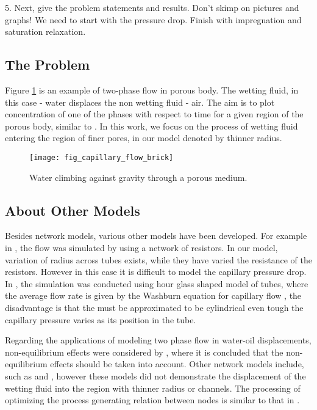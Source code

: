{5. Next, give the problem statements and results. Don't skimp on pictures and graphs!
We need to start with the pressure drop.
Finish with impregnation and saturation relaxation.




\subsection{The Problem}
	Figure \ref{fig_capillary_flow_brick} is an example of two-phase flow in porous body. The wetting fluid, in this case - water displaces the non wetting fluid - air. The aim is to plot concentration of one of the phases with respect to time for a given region of the porous body, similar to \cite{fatt1956network}. In this work, we focus on the process of wetting fluid entering the region of finer pores, in our model denoted by thinner radius.
	
	\begin{figure}[H]
		\texttt{[image: fig\_capillary\_flow\_brick]}
		\caption{Water climbing against gravity through a porous medium. \cite{wiki:Capillary_action}}
		\label{fig_capillary_flow_brick}
	\end{figure}
	
\subsection{About Other Models}
	Besides network models, various other models have been developed. For example in \cite{fatt1956network}, the flow was simulated by using a network of resistors. In our model, variation of radius across tubes exists, while they have varied the resistance of the resistors. However in this case it is difficult to model the capillary pressure drop. In \cite{aker1998two}, the simulation was conducted using hour glass shaped model of tubes, where the average flow rate is given by the Washburn equation for capillary flow \cite{washburn1921dynamics}, the disadvantage is that the must be approximated to be cylindrical even tough the capillary pressure varies as its position in the tube. 
	
	
	Regarding the applications of modeling two phase flow in water-oil displacements, non-equilibrium effects were considered by \cite{barenblatt2003mathematical}, where it is concluded that the non-equilibrium effects should be taken into account. Other network models include, such as \cite{chen1985pore} and \cite{king1987fractal}, however these models did not demonstrate the displacement of the wetting fluid into the region with thinner radius or channels. The processing of optimizing the process generating relation between nodes is similar to that in \cite{raoof2010new}. 
		
}
